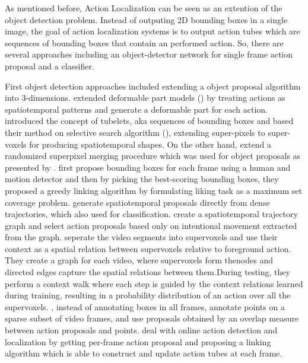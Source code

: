 As mentioned before, Action Localization can be seen as an extention of the object detection problem. Instead of outputing 2D bounding
boxes in a single image, the goal of action localization systems is to output action tubes which are sequences of bounding boxes that
contain an performed action. So, there are several approaches including an object-detector network for single frame
action proposal and a classifier. \par
First object detection approaches included extending a object proposal algorithm into 3-dimensions. \cite{6619185} extended deformable part models (\cite{5255236})  by treating actions as spatiotemporal patterns and generate a deformable part for each action. \cite{6909495} introduced the concept of tubelets, aka sequences of bounding boxes and based their method on selective search algorithm
(\cite{Uijlings13}), extending super-pixels to super-voxels for producing spatiotemporal shapes. On the other hand, \cite{Oneata}
extend a randomized superpixel merging procedure which was used for object proposals as presented by \cite{Manen:2013:POP:2586117.2587333}.
\cite{7298735} first propose bounding boxes for each frame using a human and motion detector and then by picking the best-scoring bounding boxes,
they proposed a greedy linking algorithm by formulating liking task as a maximum set coverage problem. \cite{BMVC2015_177} generate spatiotemporal proposals directly from dense trajectories, which also used for classification. \cite{7410734} create a spatiotemporal trajectory
graph and select action proposals based only on intentional movement extracted from the graph. \cite{7410732} seperate the video segments
into supervoxels and use their context as a spatial relation between supervoxels relative to foreground action. They create a graph for each
video, where supervoxels form thenodes and directed edges capture the spatial relations between them.During testing, they  perform a context
walk where each step is guided by the context relations learned during training, resulting in a probability distribution of an action over all the supervoxels. \cite{DBLP:journals/corr/MettesGS16}, instead of annotating boxes in all frames, annotate points on a sparse subset of video
frames, and use proposals obtained by an overlap measure between action proposals and points. \cite{DBLP:journals/corr/BehlSSSCT17} deal with
online action detection and localization by getting per-frame action proposal and  proposing a linking algorithm which is able to construct and update action tubes at each frame.


